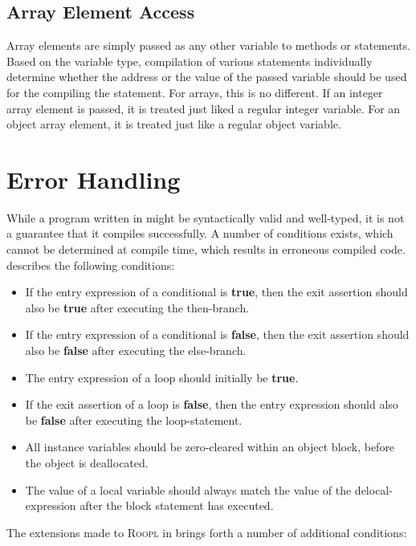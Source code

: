 \subsection{Array Element Access}
\label{subsec:array-element-access}
Array elements are simply passed as any other variable to methods or statements. Based on the variable type, compilation of various statements individually determine whether the address or the value of the passed variable should be used for the compiling the statement. For arrays, this is no different. If an integer array element is passed, it is treated just liked a regular integer variable. For an object array element, it is treated just like a regular object variable. 


\section{Error Handling}
\label{sec:error-handling}
While a program written in \rooplpp might be syntactically valid and well-typed, it is not a guarantee that it compiles successfully. A number of conditions exists, which cannot be determined at compile time, which results in erroneous compiled code. \citeauthor{th:roopl} describes the following conditions:

\begin{itemize}
    \item If the entry expression of a conditional is \textbf{true}, then the exit assertion should also be \textbf{true} after executing the then-branch.
    \item If the entry expression of a conditional is \textbf{false}, then the exit assertion should also be \textbf{false} after executing the else-branch.
    \item The entry expression of a loop should initially be \textbf{true}.
    \item If the exit assertion of a loop is \textbf{false}, then the entry expression should also be \textbf{false} after executing the loop-statement.
    \item All instance variables should be zero-cleared within an object block, before the object is deallocated.
    \item The value of a local variable should always match the value of the delocal-expression after the block statement has executed.
\end{itemize}

The extensions made to \textsc{Roopl} in \rooplpp brings forth a number of additional conditions:

